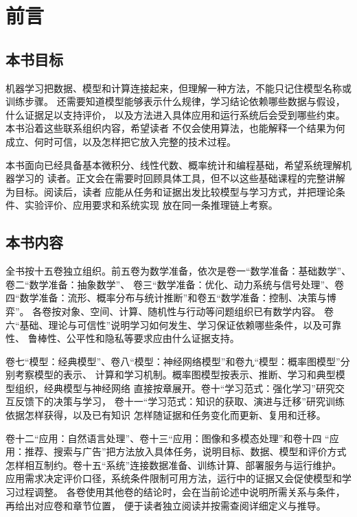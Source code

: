 \chapter*{前言}

\section*{本书目标}

机器学习把数据、模型和计算连接起来，但理解一种方法，不能只记住模型名称或训练步骤。
还需要知道模型能够表示什么规律，学习结论依赖哪些数据与假设，什么证据足以支持评价，
以及方法进入具体应用和运行系统后会受到哪些约束。本书沿着这些联系组织内容，希望读者
不仅会使用算法，也能解释一个结果为何成立、何时可信，以及怎样把它放入完整的技术过程。

本书面向已经具备基本微积分、线性代数、概率统计和编程基础，希望系统理解机器学习的
读者。正文会在需要时回顾具体工具，但不以这些基础课程的完整讲解为目标。阅读后，读者
应能从任务和证据出发比较模型与学习方式，并把理论条件、实验评价、应用要求和系统实现
放在同一条推理链上考察。

\section*{本书内容}

全书按十五卷独立组织。前五卷为数学准备，依次是卷一“数学准备：基础数学”、卷二“数学准备：抽象数学”、
卷三“数学准备：优化、动力系统与信号处理”、卷四“数学准备：流形、概率分布与统计推断”和卷五“数学准备：控制、决策与博弈”。
各卷按对象、空间、计算、随机性与行动等问题组织已有数学内容。
卷六“基础、理论与可信性”说明学习如何发生、学习保证依赖哪些条件，以及可靠性、
鲁棒性、公平性和隐私等要求应由什么证据支持。

卷七“模型：经典模型”、卷八“模型：神经网络模型”和卷九“模型：概率图模型”分别考察模型的表示、
计算和学习机制。概率图模型按表示、推断、学习和典型模型组织，经典模型与神经网络
直接按章展开。卷十“学习范式：强化学习”研究交互反馈下的决策与学习，
卷十一“学习范式：知识的获取、演进与迁移”研究训练依据怎样获得，以及已有知识
怎样随证据和任务变化而更新、复用和迁移。

卷十二“应用：自然语言处理”、卷十三“应用：图像和多模态处理”和卷十四
“应用：推荐、搜索与广告”把方法放入具体任务，说明目标、数据、模型和评价方式
怎样相互制约。卷十五“系统”连接数据准备、训练计算、部署服务与运行维护。
应用需求决定评价口径，系统条件限制可用方法，运行中的证据又会促使模型和学习过程调整。
各卷使用其他卷的结论时，会在当前论述中说明所需关系与条件，再给出对应卷和章节位置，
便于读者独立阅读并按需查阅详细定义与推导。

